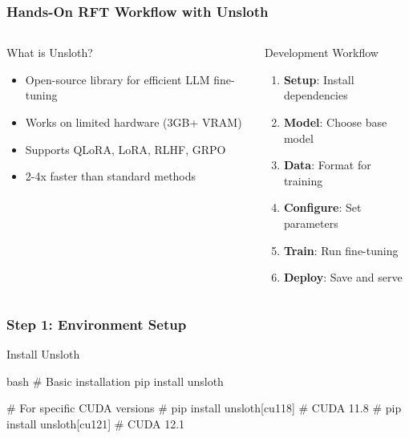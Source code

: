 \documentclass[aspectratio=169]{beamer}
\begin{document}
\begin{frame}[shrink=60]
	\frametitle{Hands-On RFT Workflow with Unsloth}
	\begin{columns}[T]
		\begin{column}{0.48\textwidth}
			\begin{block}{What is Unsloth?}
				\begin{itemize}
					\item Open-source library for efficient LLM fine-tuning
					\item Works on limited hardware (3GB+ VRAM)
					\item Supports QLoRA, LoRA, RLHF, GRPO
					\item 2-4x faster than standard methods
				\end{itemize}
			\end{block}
		\end{column}
		\begin{column}{0.48\textwidth}
			\begin{block}{Development Workflow}
				\begin{enumerate}
					\item \textbf{Setup}: Install dependencies
					\item \textbf{Model}: Choose base model
					\item \textbf{Data}: Format for training
					\item \textbf{Configure}: Set parameters
					\item \textbf{Train}: Run fine-tuning
					\item \textbf{Deploy}: Save and serve
				\end{enumerate}
			\end{block}
		\end{column}
	\end{columns}
\end{frame}

\begin{frame}[fragile]
	\frametitle{Step 1: Environment Setup}
	\begin{block}{Install Unsloth}
		\begin{mintedbox}{bash}
# Basic installation
pip install unsloth

# For specific CUDA versions
# pip install unsloth[cu118]  # CUDA 11.8
# pip install unsloth[cu121]  # CUDA 12.1
		\end{mintedbox}
	\end{block}
\end{frame}
\end{document}
